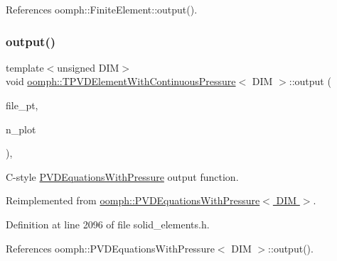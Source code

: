References oomph\+::\+Finite\+Element\+::output().

\mbox{\label{classoomph_1_1TPVDElementWithContinuousPressure_a943ae7f4fcad3538108a207325160c92}} 
\subsubsection{\texorpdfstring{output()}{output()}\hspace{0.1cm}{\footnotesize\ttfamily [4/4]}}
{\footnotesize\ttfamily template$<$unsigned D\+IM$>$ \\
void \hyperlink{classoomph_1_1TPVDElementWithContinuousPressure}{oomph\+::\+T\+P\+V\+D\+Element\+With\+Continuous\+Pressure}$<$ D\+IM $>$\+::output (\begin{DoxyParamCaption}\item[{F\+I\+LE $\ast$}]{file\+\_\+pt,  }\item[{const unsigned \&}]{n\+\_\+plot }\end{DoxyParamCaption})\hspace{0.3cm}{\ttfamily [inline]}, {\ttfamily [virtual]}}



C-\/style \hyperlink{classoomph_1_1PVDEquationsWithPressure}{P\+V\+D\+Equations\+With\+Pressure} output function. 



Reimplemented from \hyperlink{classoomph_1_1PVDEquationsWithPressure_a27aee23c253bef90a7f389acd376fd27}{oomph\+::\+P\+V\+D\+Equations\+With\+Pressure$<$ D\+I\+M $>$}.



Definition at line 2096 of file solid\+\_\+elements.\+h.



References oomph\+::\+P\+V\+D\+Equations\+With\+Pressure$<$ D\+I\+M $>$\+::output().

\mbox{\label{classoomph_1_1TPVDElementWithContinuousPressure_a4eac0138cea57bc72b3aaf8fe750694e}} 
